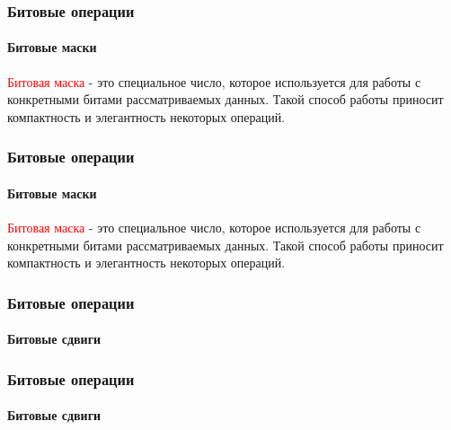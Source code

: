 \documentclass[aspectratio=169]{beamer}
\begin{document}
\begin{frame}
\frametitle{Битовые операции}
\framesubtitle{Битовые маски}
\justifying
\small
\textcolor{red}{Битовая маска} - это специальное число, которое используется для работы с конкретными битами рассматриваемых данных. Такой способ работы приносит компактность и элегантность некоторых операций.
\begin{figure}
    \captionsetup[subfigure]{labelformat=empty}
    \centering
\end{figure}
\end{frame}

\begin{frame}
\frametitle{Битовые операции}
\framesubtitle{Битовые маски}
\justifying
\small
\textcolor{red}{Битовая маска} - это специальное число, которое используется для работы с конкретными битами рассматриваемых данных. Такой способ работы приносит компактность и элегантность некоторых операций.
\begin{figure}
    \captionsetup[subfigure]{labelformat=empty}
    \centering
\end{figure}
\end{frame}

\begin{frame}
\frametitle{Битовые операции}
\framesubtitle{Битовые сдвиги}
\justifying
\begin{figure}
    \captionsetup[subfigure]{labelformat=empty}
    \centering
\end{figure}
\end{frame}

\begin{frame}
\frametitle{Битовые операции}
\framesubtitle{Битовые сдвиги}
\justifying
\begin{figure}
    \captionsetup[subfigure]{labelformat=empty}
    \centering
\end{figure}
\end{frame}
\end{document}
